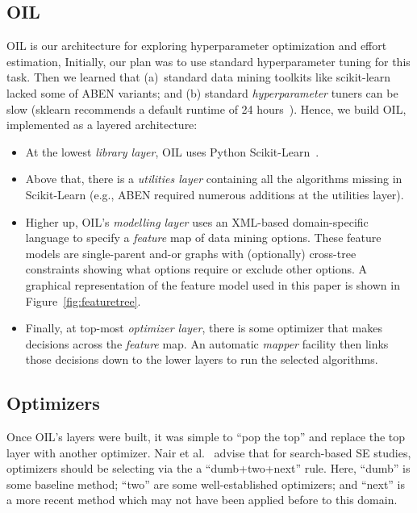 \documentclass[10pt,conference]{IEEEtran}
\newcommand{\bi}{\begin{itemize}}
\newcommand{\ei}{\end{itemize}}
\newcommand{\fig}[1]{Figure~\ref{fig:#1}}
\begin{document}







\subsection{OIL}


  OIL is  our  architecture for exploring hyperparameter optimization and effort estimation,
  Initially, our plan
was to use standard hyperparameter  tuning for this task. Then we learned that (a)~standard data mining toolkits like scikit-learn~\cite{pedregosa2011scikit} lacked 
some of  ABEN variants; and (b) standard {\em hyperparameter} tuners can be  slow     (sklearn recommends a default runtime of 24 hours~\cite{sk18}).  Hence, we build OIL,  implemented as a 
 layered architecture:
 \bi
 \item
At the lowest {\em library layer}, OIL uses   Python  Scikit-Learn~\cite{pedregosa2011scikit}. 
\item
Above that, there is a {\em utilities layer} containing all the algorithms missing in Scikit-Learn (e.g., ABEN required
numerous additions at the utilities layer). 
\item
Higher up, OIL's {\em modelling layer} uses an XML-based domain-specific language to specify a {\em feature} map of data mining options.
These feature models are single-parent and-or graphs with (optionally) cross-tree constraints showing what options require or exclude other options.
A graphical representation of  the feature model used in this paper is shown in \fig{featuretree}.
\item
Finally, at top-most {\em optimizer layer}, there is some optimizer that  makes decisions across the {\em feature} map. An automatic {\em mapper} facility then links those decisions
down to the lower layers to run the selected algorithms.  
\ei
\subsection{Optimizers}
Once OIL's layers were  built, it was simple  to ``pop the top'' and replace the top
layer with another optimizer.
Nair et al.~\cite{nair18}   advise that for search-based SE studies, optimizers should be selecting
via the a 
  ``dumb+two+next''  rule. Here,   ``dumb'' is some baseline method;
``two'' are some  well-established optimizers;  and ``next'' is a more recent method which may not have been
applied before to this domain.
\end{document}
